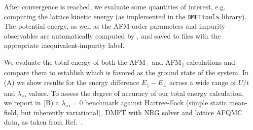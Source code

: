\documentclass[edipack_sp.tex]{subfiles}
\begin{document}
After convergence is reached, we evaluate some quantities of interest, e.g. computing the 
lattice kinetic energy (as implemented in the \texttt{DMFTtools} 
library). The potential energy, as well as the AFM order parameters
and impurity observables are automatically computed by \NAME, 
and saved to files with the appropriate inequivalent-impurity label.

We evaluate the total energy of both the AFM$_\perp$
and AFM$_\parallel$ calculations and compare them to establish which  is favored as the ground state of the system. In (A)
we show results for the energy difference $E_\parallel-E_\perp$ across a wide range of $U/t$ and $\lambda_\mathrm{so}$ values. To assess the
degree of accuracy of our total energy calculation, we report in
(B) a $\lambda_\mathrm{so}=0$ benchmark against
Hartree-Fock (simple static mean-field, but inherently variational), 
DMFT with NRG solver and lattice AFQMC data, as taken from 
Ref.~\cite{Racz2020}. 
\end{document}
